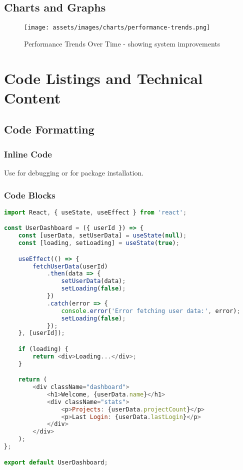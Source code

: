 \documentclass{internshipreport}
\begin{document}
\section{Charts and Graphs}

\begin{figure}[H]
\centering
\texttt{[image: assets/images/charts/performance-trends.png]}
\caption{Performance Trends Over Time - showing system improvements}
\label{fig:performance-trends}
\end{figure}

\chapter{Code Listings and Technical Content}
\label{chap:code}

\section{Code Formatting}

\subsection{Inline Code}

Use  for debugging or  for package installation.

\subsection{Code Blocks}

\begin{lstlisting}[language=JavaScript, caption=React Component Example]
import React, { useState, useEffect } from 'react';

const UserDashboard = ({ userId }) => {
    const [userData, setUserData] = useState(null);
    const [loading, setLoading] = useState(true);

    useEffect(() => {
        fetchUserData(userId)
            .then(data => {
                setUserData(data);
                setLoading(false);
            })
            .catch(error => {
                console.error('Error fetching user data:', error);
                setLoading(false);
            });
    }, [userId]);

    if (loading) {
        return <div>Loading...</div>;
    }

    return (
        <div className="dashboard">
            <h1>Welcome, {userData.name}</h1>
            <div className="stats">
                <p>Projects: {userData.projectCount}</p>
                <p>Last Login: {userData.lastLogin}</p>
            </div>
        </div>
    );
};

export default UserDashboard;
\end{lstlisting}
\end{document}

